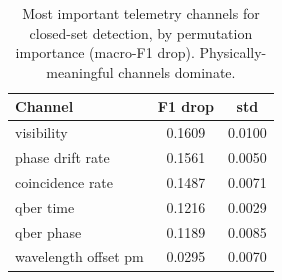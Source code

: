 \begin{table}[t]
\centering
\caption{Most important telemetry channels for closed-set detection, by permutation importance (macro-F1 drop). Physically-meaningful channels dominate.}
\label{tab:channel-importance}
\begin{tabular}{lcc}
\toprule
Channel & F1 drop & std \\
\midrule
visibility & 0.1609 & 0.0100 \\
phase drift rate & 0.1561 & 0.0050 \\
coincidence rate & 0.1487 & 0.0071 \\
qber time & 0.1216 & 0.0029 \\
qber phase & 0.1189 & 0.0085 \\
wavelength offset pm & 0.0295 & 0.0070 \\
\bottomrule
\end{tabular}
\end{table}
